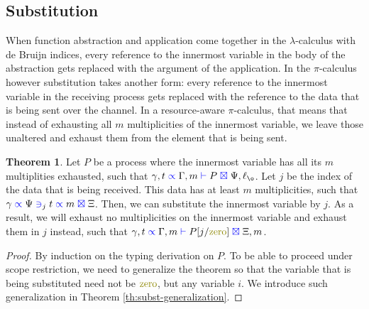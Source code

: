 \documentclass[a4paper,UKenglish,cleveref, autoref, thm-restate,authorcolumns]{lipics-v2019}
\theoremstyle{definition}
\newtheorem{nitheorem}[theorem]{Theorem}
\newcommand{\lambdacalc}{$\lambda$-calculus}
\newcommand{\picalc}{$\pi$-calculus}
\newcommand{\type}[1]{\textcolor{blue}{\operatorname{#1}}}
\newcommand{\constr}[1]{\textcolor{olive}{\operatorname{#1}}}
\newcommand{\subst}[3]{#1[#2/#3]}
\newcommand{\types}[4]{#1 \; \type{\propto} \; #2 \; \type{\vdash} \; #3 \; \type{\boxtimes} \; #4}
\newcommand{\contains}[6]{#1 \; \type{\propto} \; #2 \; \type{\ni}_{#3} \; #4 \; \type{\propto} \; #5 \; \type{\boxtimes} \; #6}
\begin{document}
\subsection{Substitution}

When function abstraction and application come together in the \lambdacalc{} with de Bruijn indices, every reference to the innermost variable in the body of the abstraction gets replaced with the argument of the application.
In the \picalc{} however substitution takes another form: every reference to the innermost variable in the receiving process gets replaced with the reference to the data that is being sent over the channel.
In a resource-aware \picalc{}, that means that instead of exhausting all $m$ multiplicities of the innermost variable, we leave those unaltered and exhaust them from the element that is being sent.

\begin{nitheorem}
  Let $P$ be a process where the innermost variable has all its $m$ multiplities exhausted, such that $\types{\gamma , t}{\Gamma , m}{P}{\Psi , \ell_{\o}}$.
  Let $j$ be the index of the data that is being received.
  This data has at least $m$ multiplicities, such that $\contains{\gamma}{\Psi}{j}{t}{m}{\Xi}$.
  Then, we can substitute the innermost variable by $j$.
  As a result, we will exhaust no multiplicities on the innermost variable and exhaust them in $j$ instead, such that $\types{\gamma , t}{\Gamma , m}{\subst{P}{j}{\constr{zero}}}{\Xi , m}$.
\end{nitheorem}

\begin{proof}
  By induction on the typing derivation on $P$.
  To be able to proceed under scope restriction, we need to generalize the theorem so that the variable that is being substituted need not be $\constr{zero}$, but any variable $i$.
  We introduce such generalization in Theorem \ref{th:subst-generalization}.
\end{proof}
\end{document}
